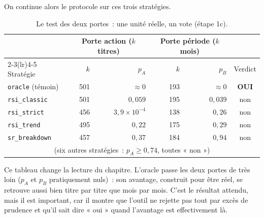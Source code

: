 On continue alors le protocole sur ces trois stratégies.

\begin{table}[H]
\centering
\caption{Le test des deux portes~: une unité réelle, un vote (étape 1c).}
\label{tab:b1-dep-portes}
\small
\begin{tabular}{@{}lrrrrc@{}}
\toprule
 & \multicolumn{2}{c}{Porte action ($k$ titres)} & \multicolumn{2}{c}{Porte période ($k$ mois)} & \\
\cmidrule(lr){2-3}\cmidrule(lr){4-5}
Stratégie & $k$ & $p_A$ & $k$ & $p_B$ & Verdict \\
\midrule
\texttt{oracle} (témoin) & 501 & $\approx 0$          & 193 & $\approx 0$ & \textbf{OUI} \\
\midrule
\texttt{rsi\_classic}  & 501 & $0{,}059$            & 195 & $0{,}039$ & non \\
\texttt{rsi\_strict}   & 456 & $3{,}9\times10^{-4}$ & 138 & $0{,}26$  & non \\
\texttt{rsi\_trend}    & 495 & $0{,}22$             & 175 & $0{,}29$  & non \\
\texttt{sr\_breakdown} & 457 & $0{,}37$             & 184 & $0{,}94$  & non \\
\multicolumn{6}{c}{\footnotesize (six autres stratégies~: $p_A \ge 0{,}74$, toutes « non »)} \\
\bottomrule
\end{tabular}
\end{table}
Ce tableau change la lecture du chapitre. L'oracle passe les deux
portes de très loin ($p_A$ et $p_B$ pratiquement nuls)~: son avantage,
construit pour être réel, se retrouve aussi bien titre par titre que mois par
mois. C'est le résultat attendu, mais il est important, car il montre que
l'outil ne rejette pas tout par excès de prudence et qu'il sait dire
« oui » quand l'avantage est effectivement là.

